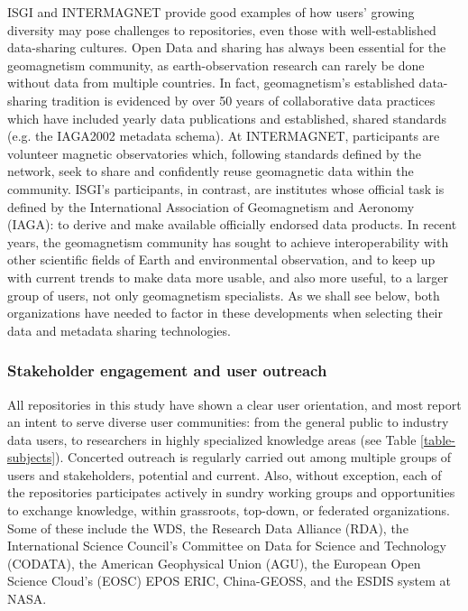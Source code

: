 \documentclass{interact}
\begin{document}
ISGI and INTERMAGNET provide good examples of how users' growing diversity may pose challenges to repositories, even those with well-established data-sharing cultures. Open Data and sharing has always been essential for the geomagnetism community, as earth-observation research can rarely be done without data from multiple countries. In fact, geomagnetism's established data-sharing tradition is evidenced by over 50 years of collaborative data practices which have included yearly data publications and established, shared standards (e.g. the IAGA2002 metadata schema). At INTERMAGNET, participants are volunteer magnetic observatories which, following standards defined by the network, seek to share and confidently reuse geomagnetic data within the community. ISGI's participants, in contrast, are institutes whose official task is defined by the International Association of Geomagnetism and Aeronomy (IAGA): to derive and make available officially endorsed data products. In recent years, the geomagnetism community has sought to achieve interoperability with other scientific fields of Earth and environmental observation, and to keep up with current trends to make data more usable, and also more useful, to a larger group of users, not only geomagnetism specialists. As we shall see below, both organizations have needed to factor in these developments when selecting their data and metadata sharing technologies.

\subsubsection{Stakeholder engagement and user outreach}\label{userintelligence}
All repositories in this study have shown a clear user orientation, and most report an intent to serve diverse user communities: from the general public to industry data users, to researchers in highly specialized knowledge areas (see Table \ref{table-subjects}). Concerted outreach is regularly carried out among multiple groups of users and stakeholders, potential and current. Also, without exception, each of the repositories participates actively in sundry working groups and opportunities to exchange knowledge, within grassroots, top-down, or federated organizations. Some of these include the WDS, the Research Data Alliance (RDA), the International Science Council's Committee on Data for Science and Technology (CODATA), the American Geophysical Union (AGU), the European Open Science Cloud's (EOSC) EPOS ERIC, China-GEOSS, and the ESDIS system at NASA.
\end{document}
